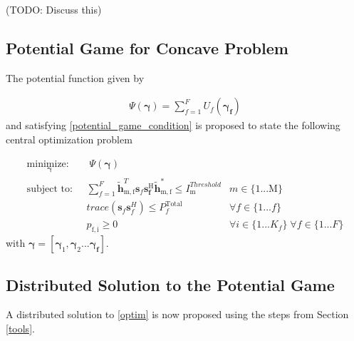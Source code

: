 \documentclass[12pt,a4paper]{report}
\begin{document}
(TODO: Discuss this)

\subsection{Potential Game for Concave Problem}

The potential function given by 

\begin{gather*} \label{Potential_Function}
\Psi(\mathbf{\boldsymbol{\gamma}}) = \sum_{f = 1}^{F} U_{f}(\mathbf{\boldsymbol{\gamma}_{f}})
\end{gather*}
and 
satisfying \eqref{potential_game_condition} is proposed to state the following central optimization problem
	
		\begin{subequations}
	\label{optim}
	\begin{align}
	    \underset{\mathbf{\gamma}}{\text{minimize: }}
	    & \; \Psi(\mathbf{\gamma}) \label{potential_game} \\
	    \text{subject to: } \; &
	  \sum^F_{f=1} \mathbf{\tilde{h}}_{\mathrm{m,f}}^T  \mathbf{s}_{f} 						
	\mathbf{s_{f}^{\mathrm{H}}} \mathbf{\tilde{h}_{\mathrm{m,f}}^*} \leq I^{Threshold}		
	_{\mathrm{m}} & m \in \{1 ...\text{M}\} 
		\label{interference_const}\\
        & trace(\mathbf{s}_f\mathbf{s}_f^H)  \leq P_{f}^{\text{Total}}  \label{power_const}
        & \forall f \in \{1 ... f\}\\
        & p_{\mathrm{f,i}} \geq 0 &  \forall i \in \{1 ...K_{f}\} \; \forall f \in \{1 ... F\}\label{pos_power_const}
	\end{align}
	\end{subequations}
	with $\mathbf{\gamma}= [\mathbf{\gamma_{\mathrm{1}}},\mathbf{\gamma_{\mathrm{2}}}...\mathbf{\gamma_{f}}]$.


\subsection{Distributed Solution to the Potential Game}
A distributed solution to \eqref{optim} is now proposed using the steps from Section \ref{tools}.
\end{document}
